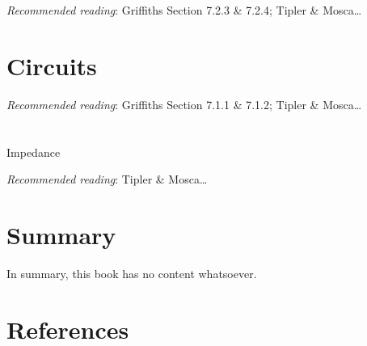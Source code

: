\documentclass[
  letterpaper,
  DIV=11,
  numbers=noendperiod]{scrreprt}
\newlength{\cslhangindent}
\newenvironment{CSLReferences}[2] %
 {\begin{list}{}{%
  \setlength{\itemindent}{0pt}
  \setlength{\leftmargin}{0pt}
  \setlength{\parsep}{0pt}
  \ifodd #1
   \setlength{\leftmargin}{\cslhangindent}
   \setlength{\itemindent}{-1\cslhangindent}
  \fi
  \setlength{\itemsep}{#2\baselineskip}}}
 {\end{list}}
\begin{document}
\emph{Recommended reading}: Griffiths Section 7.2.3 \& 7.2.4; Tipler \&
Mosca\ldots{}


\chapter{Circuits}\label{circuits}

\newcommand{\l}{\mathrm{\mathbf{l}}}
\newcommand{\E}{\mathrm{\mathbf{E}}}
\newcommand{\F}{\mathrm{\mathbf{F}}}
\newcommand{\r}{\mathrm{\mathbf{r}}}

\newcommand{\x}{\mathrm{\mathbf{x}}}
\newcommand{\y}{\mathrm{\mathbf{y}}}
\newcommand{\z}{\mathrm{\mathbf{z}}}

\emph{Recommended reading}: Griffiths Section 7.1.1 \& 7.1.2; Tipler \&
Mosca\ldots{}


\chapter{}\label{section}

\newcommand{\l}{\mathrm{\mathbf{l}}}
\newcommand{\E}{\mathrm{\mathbf{E}}}
\newcommand{\F}{\mathrm{\mathbf{F}}}
\newcommand{\r}{\mathrm{\mathbf{r}}}

\newcommand{\x}{\mathrm{\mathbf{x}}}
\newcommand{\y}{\mathrm{\mathbf{y}}}
\newcommand{\z}{\mathrm{\mathbf{z}}}

Impedance

\emph{Recommended reading}: Tipler \& Mosca\ldots{}


\chapter{Summary}\label{summary-2}

In summary, this book has no content whatsoever.


\chapter*{References}\label{references}


\label{refs}
\begin{CSLReferences}{0}{1}
\end{CSLReferences}
\end{document}

